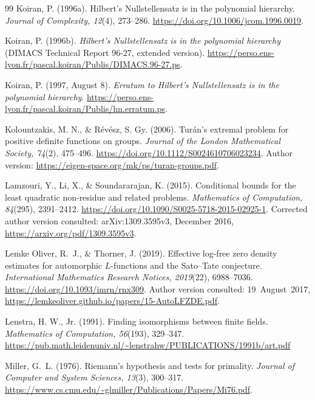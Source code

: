 \documentclass[11pt]{article}
\theoremstyle{definition}
\theoremstyle{remark}
\begin{document}
\begin{thebibliography}{99}
Koiran, P. (1996a). Hilbert's Nullstellensatz is in the polynomial hierarchy.
\emph{Journal of Complexity, 12}(4), 273--286.
\url{https://doi.org/10.1006/jcom.1996.0019}.

Koiran, P. (1996b). \emph{Hilbert's Nullstellensatz is in the polynomial hierarchy}
(DIMACS Technical Report 96-27, extended version).
\url{https://perso.ens-lyon.fr/pascal.koiran/Publis/DIMACS.96-27.ps}.

Koiran, P. (1997, August 8).
\emph{Erratum to Hilbert's Nullstellensatz is in the polynomial hierarchy}.
\url{https://perso.ens-lyon.fr/pascal.koiran/Publis/hn.erratum.ps}.

Kolountzakis, M. N., \& R\'ev\'esz, S. Gy. (2006).
Tur\'an's extremal problem for positive definite functions on groups.
\emph{Journal of the London Mathematical Society, 74}(2), 475--496.
\url{https://doi.org/10.1112/S0024610706023234}.
Author version:
\url{https://eigen-space.org/mk/ps/turan-groups.pdf}.

Lamzouri, Y., Li, X., \& Soundararajan, K. (2015).
Conditional bounds for the least quadratic non-residue and related problems.
\emph{Mathematics of Computation, 84}(295), 2391--2412.
\url{https://doi.org/10.1090/S0025-5718-2015-02925-1}.
Corrected author version consulted: arXiv:1309.3595v3, December 2016,
\url{https://arxiv.org/pdf/1309.3595v3}.

Lemke Oliver, R.~J., \& Thorner, J. (2019).
Effective log-free zero density estimates for automorphic \(L\)-functions
and the Sato--Tate conjecture.
\emph{International Mathematics Research Notices, 2019}(22), 6988--7036.
\url{https://doi.org/10.1093/imrn/rnx309}.
Author version consulted: 19~August~2017,
\url{https://lemkeoliver.github.io/papers/15-AutoLFZDE.pdf}.

Lenstra, H. W., Jr. (1991). Finding isomorphisms between finite fields.
\emph{Mathematics of Computation, 56}(193), 329--347.
\url{https://pub.math.leidenuniv.nl/~lenstrahw/PUBLICATIONS/1991b/art.pdf}

Miller, G.~L. (1976). Riemann's hypothesis and tests for primality.
\emph{Journal of Computer and System Sciences, 13}(3), 300--317.
\url{https://www.cs.cmu.edu/~glmiller/Publications/Papers/Mi76.pdf}.


\end{thebibliography}
\end{document}
